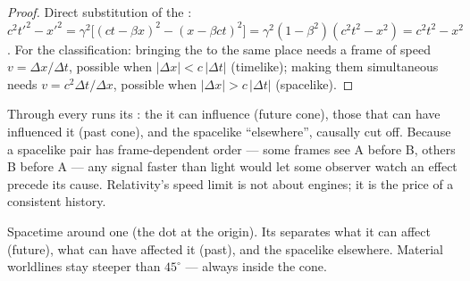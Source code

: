 \begin{proof}
Direct substitution of the :
$c^2t'^2 - x'^2 = \gamma^2\big[(ct - \beta x)^2 - (x - \beta ct)^2
\big] = \gamma^2(1 - \beta^2)(c^2t^2 - x^2) = c^2t^2 - x^2$.
For the classification: bringing the  to the same place needs a
frame of speed $v = \Delta x/\Delta t$, possible when $|\Delta x| <
c\,|\Delta t|$ (timelike); making them simultaneous needs $v =
c^2\Delta t/\Delta x$, possible when $|\Delta x| > c\,|\Delta t|$
(spacelike).
\end{proof}

\begin{remark}\label{rem:b3:relativistic-kinematics:causality}
Through every  runs its \emph{}: the  it can
influence (future cone), those that can have influenced it (past
cone), and the spacelike ``elsewhere'', causally cut off. Because a
spacelike pair has frame-dependent order --- some frames see A before
B, others B before A --- any signal faster than light would let some
observer watch an effect precede its cause. Relativity's speed limit
is not about engines; it is the price of a consistent history.
\end{remark}

\begin{omfigure}

{\small Spacetime around one  (the dot at the origin). Its  separates what it
can affect (future), what can have affected it (past), and the
spacelike elsewhere. Material worldlines stay steeper than $45^\circ$
--- always inside the cone.}
\end{omfigure}

